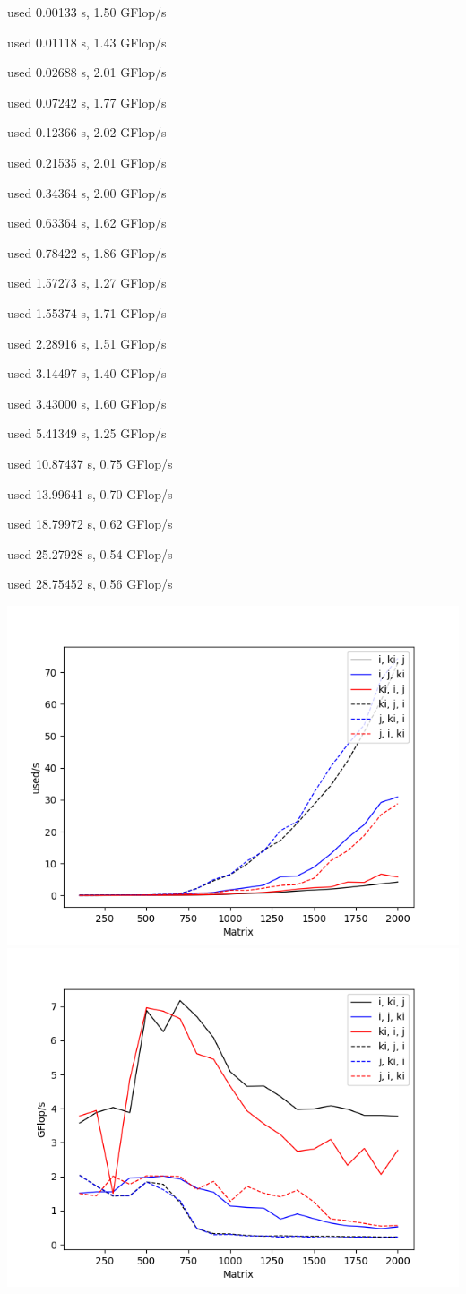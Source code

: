 \documentclass[12pt]{article}
\begin{document}
used 0.00133 s, 1.50 GFlop/s

used 0.01118 s, 1.43 GFlop/s

used 0.02688 s, 2.01 GFlop/s

used 0.07242 s, 1.77 GFlop/s

used 0.12366 s, 2.02 GFlop/s

used 0.21535 s, 2.01 GFlop/s

used 0.34364 s, 2.00 GFlop/s

used 0.63364 s, 1.62 GFlop/s

used 0.78422 s, 1.86 GFlop/s

used 1.57273 s, 1.27 GFlop/s

used 1.55374 s, 1.71 GFlop/s

used 2.28916 s, 1.51 GFlop/s

used 3.14497 s, 1.40 GFlop/s

used 3.43000 s, 1.60 GFlop/s

used 5.41349 s, 1.25 GFlop/s

used 10.87437 s, 0.75 GFlop/s

used 13.99641 s, 0.70 GFlop/s

used 18.79972 s, 0.62 GFlop/s

used 25.27928 s, 0.54 GFlop/s

used 28.75452 s, 0.56 GFlop/s

\includegraphics[scale=0.5]{2s}
\includegraphics[scale=0.5]{2g}
\end{document}
